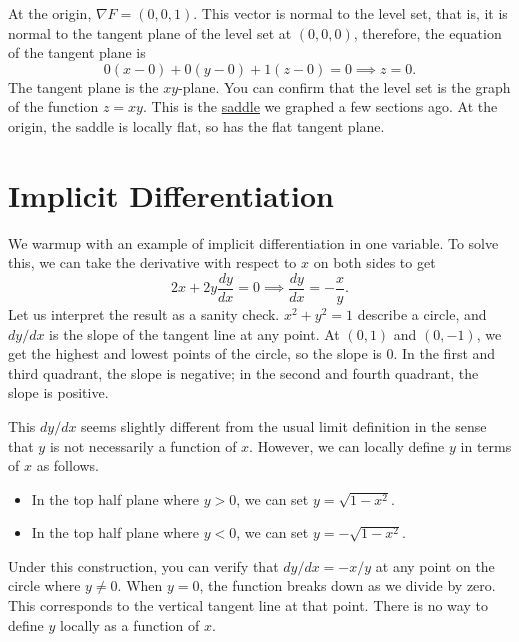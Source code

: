 At the origin, $\nabla F = (0,0,1)$. This vector is normal to the level set, that is, it is normal to the tangent plane of the level set at $(0,0,0)$, therefore, the equation of the tangent plane is \[
0(x-0) + 0(y-0) + 1(z-0) = 0 \implies z=0.
\]
The tangent plane is the $xy$-plane. You can confirm that the level set is the graph of the function $z=xy$. This is the \hyperref[saddle]{saddle} we graphed a few sections ago. At the origin, the saddle is locally flat, so has the flat tangent plane.
\section{Implicit Differentiation}
We warmup with an example of implicit differentiation in one variable.
To solve this, we can take the derivative with respect to $x$ on both sides to get \[
2x+2y \frac{dy}{dx}=0 \implies \frac{dy}{dx}=-\frac{x}{y}.
\]
Let us interpret the result as a sanity check. $x^2+y^2=1$ describe a circle, and $dy/dx$ is the slope of the tangent line at any point. At $(0,1)$ and $(0,-1)$, we get the highest and lowest points of the circle, so the slope is $0$. In the first and third quadrant, the slope is negative; in the second and fourth quadrant, the slope is positive.

This $dy/dx$ seems slightly different from the usual limit definition in the sense that $y$ is not necessarily a function of $x$. However, we can locally define $y$ in terms of $x$ as follows. \begin{itemize}
    \item In the top half plane where $y>0$, we can set $y=\sqrt{1-x^2}$.
    \item In the top half plane where $y<0$, we can set $y=-\sqrt{1-x^2}$.
\end{itemize}
Under this construction, you can verify that $dy/dx=-x/y$ at any point on the circle where $y\neq 0$. When $y=0$, the function breaks down as we divide by zero. This corresponds to the vertical tangent line at that point. There is no way to define $y$ locally as a function of $x$. 

